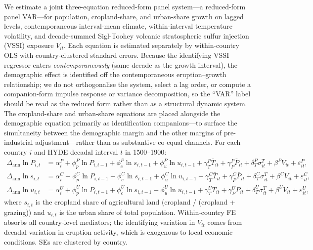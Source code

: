 \documentclass[11pt,letterpaper]{article}
\begin{document}
We estimate a joint three-equation reduced-form panel system---a reduced-form panel VAR---for population, cropland-share, and urban-share growth on lagged levels, contemporaneous interval-mean climate, within-interval temperature volatility, and decade-summed Sigl-Toohey volcanic stratospheric sulfur injection (VSSI) exposure $V_{it}$. Each equation is estimated separately by within-country OLS with country-clustered standard errors. Because the identifying VSSI regressor enters \emph{contemporaneously} (same decade as the growth interval), the demographic effect is identified off the contemporaneous eruption--growth relationship; we do not orthogonalise the system, select a lag order, or compute a companion-form impulse response or variance decomposition, so the ``VAR'' label should be read as the reduced form rather than as a structural dynamic system. The cropland-share and urban-share equations are placed alongside the demographic equation primarily as identification companions---to surface the simultaneity between the demographic margin and the other margins of pre-industrial adjustment---rather than as substantive co-equal channels. For each country $i$ and HYDE decadal interval $t$ in 1500--1900:
\begin{align}
  \Delta_{\text{ann}} \ln P_{i,t}      &= \alpha^P_i + \phi^P_p \ln P_{i,t-1} + \phi^P_c \ln s_{i,t-1} + \phi^P_u \ln u_{i,t-1}
                                          + \gamma^P_T \bar T_{it} + \gamma^P_P \bar P_{it} + \delta^P_T \sigma^T_{it} + \beta^P V_{it} + \varepsilon^P_{it}, \label{eq:joint-pop}\\
  \Delta_{\text{ann}} \ln s_{i,t}      &= \alpha^C_i + \phi^C_p \ln P_{i,t-1} + \phi^C_c \ln s_{i,t-1} + \phi^C_u \ln u_{i,t-1}
                                          + \gamma^C_T \bar T_{it} + \gamma^C_P \bar P_{it} + \delta^C_T \sigma^T_{it} + \beta^C V_{it} + \varepsilon^C_{it}, \label{eq:joint-crop}\\
  \Delta_{\text{ann}} \ln u_{i,t}      &= \alpha^U_i + \phi^U_p \ln P_{i,t-1} + \phi^U_c \ln s_{i,t-1} + \phi^U_u \ln u_{i,t-1}
                                          + \gamma^U_T \bar T_{it} + \gamma^U_P \bar P_{it} + \delta^U_T \sigma^T_{it} + \beta^U V_{it} + \varepsilon^U_{it}, \label{eq:joint-urb}
\end{align}
where $s_{i,t}$ is the cropland share of agricultural land (cropland / (cropland + grazing)) and $u_{i,t}$ is the urban share of total population. Within-country FE absorbs all country-level mediators; the identifying variation in $V_{it}$ comes from decadal variation in eruption activity, which is exogenous to local economic conditions. SEs are clustered by country.
\end{document}
